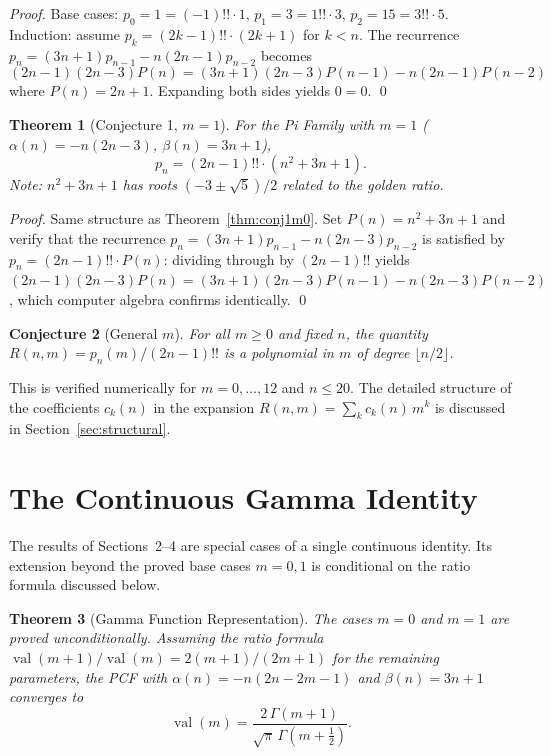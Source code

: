 \documentclass[11pt,a4paper]{article}
\newtheorem{theorem}{Theorem}
\newtheorem{conjecture}[theorem]{Conjecture}
\theoremstyle{definition}
\theoremstyle{remark}
\begin{document}
\begin{proof}
Base cases: $p_0 = 1 = (-1)!! \cdot 1$, $p_1 = 3 = 1!! \cdot 3$, $p_2 = 15 = 3!! \cdot 5$.
Induction: assume $p_k = (2k{-}1)!! \cdot (2k{+}1)$ for $k < n$.
The recurrence $p_n = (3n{+}1)p_{n-1} - n(2n{-}1)p_{n-2}$ becomes
\[
  (2n{-}1)(2n{-}3) P(n) = (3n{+}1)(2n{-}3) P(n{-}1) - n(2n{-}1) P(n{-}2)
\]
where $P(n) = 2n{+}1$. Expanding both sides yields $0 = 0$. \qed
\end{proof}

\begin{theorem}[Conjecture 1, $m=1$]\label{thm:conj1m1}
For the Pi Family with $m=1$ ($\alpha(n) = -n(2n{-}3)$, $\beta(n) = 3n{+}1$),
\[
  p_n = (2n{-}1)!! \cdot (n^2 + 3n + 1).
\]
Note: $n^2 + 3n + 1$ has roots $(-3 \pm \sqrt{5})/2$ related to the golden ratio.
\end{theorem}

\begin{proof}
Same structure as Theorem~\ref{thm:conj1m0}.
Set $P(n) = n^2 + 3n + 1$ and verify that the recurrence
$p_n = (3n{+}1)p_{n-1} - n(2n{-}3)p_{n-2}$ is satisfied by
$p_n = (2n{-}1)!! \cdot P(n)$:
dividing through by $(2n{-}1)!!$ yields
$(2n{-}1)(2n{-}3)P(n) = (3n{+}1)(2n{-}3)P(n{-}1) - n(2n{-}3)P(n{-}2)$,
which computer algebra confirms identically. \qed
\end{proof}

\begin{conjecture}[General $m$]
For all $m \ge 0$ and fixed $n$, the quantity $R(n,m) = p_n(m)/(2n{-}1)!!$
is a polynomial in $m$ of degree $\lfloor n/2 \rfloor$.
\end{conjecture}

This is verified numerically for $m = 0, \ldots, 12$ and $n \le 20$.
The detailed structure of the coefficients $c_k(n)$ in the expansion
$R(n,m) = \sum_k c_k(n)\,m^k$ is discussed in Section~\ref{sec:structural}.

\section{The Continuous Gamma Identity}\label{sec:gamma}

The results of Sections~2--4 are special cases of a single continuous identity.
Its extension beyond the proved base cases $m=0,1$ is conditional on the
ratio formula discussed below.

\begin{theorem}[Gamma Function Representation]\label{thm:gamma}
The cases $m=0$ and $m=1$ are proved unconditionally.
Assuming the ratio formula
$\operatorname{val}(m{+}1)/\operatorname{val}(m)=2(m{+}1)/(2m{+}1)$
for the remaining parameters, the PCF with $\alpha(n) = -n(2n{-}2m{-}1)$
and $\beta(n) = 3n+1$ converges to
\[
  \operatorname{val}(m) = \frac{2\,\Gamma(m{+}1)}{\sqrt{\pi}\,\Gamma(m{+}\tfrac{1}{2})}.
\]
\end{theorem}
\end{document}
